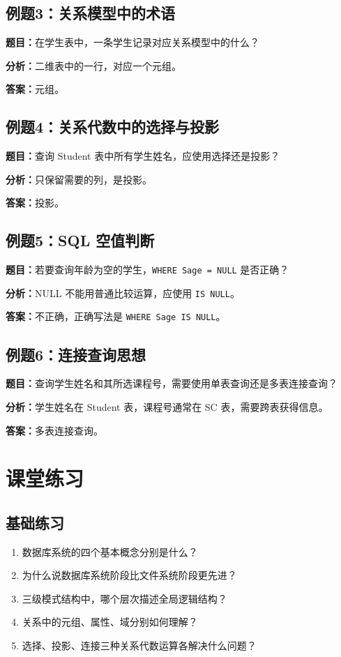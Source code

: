 \documentclass{../../note}
\begin{document}
\subsection{例题3：关系模型中的术语}

\textbf{题目：}在学生表中，一条学生记录对应关系模型中的什么？

\textbf{分析：}二维表中的一行，对应一个元组。

\textbf{答案：}元组。

\subsection{例题4：关系代数中的选择与投影}

\textbf{题目：}查询 Student 表中所有学生姓名，应使用选择还是投影？

\textbf{分析：}只保留需要的列，是投影。

\textbf{答案：}投影。

\subsection{例题5：SQL 空值判断}

\textbf{题目：}若要查询年龄为空的学生，\texttt{WHERE Sage = NULL} 是否正确？

\textbf{分析：}NULL 不能用普通比较运算，应使用 \texttt{IS NULL}。

\textbf{答案：}不正确，正确写法是 \texttt{WHERE Sage IS NULL}。

\subsection{例题6：连接查询思想}

\textbf{题目：}查询学生姓名和其所选课程号，需要使用单表查询还是多表连接查询？

\textbf{分析：}学生姓名在 Student 表，课程号通常在 SC 表，需要跨表获得信息。

\textbf{答案：}多表连接查询。

\section{课堂练习}

\subsection{基础练习}

\begin{enumerate}
  \item 数据库系统的四个基本概念分别是什么？
  \item 为什么说数据库系统阶段比文件系统阶段更先进？
  \item 三级模式结构中，哪个层次描述全局逻辑结构？
  \item 关系中的元组、属性、域分别如何理解？
  \item 选择、投影、连接三种关系代数运算各解决什么问题？
\end{enumerate}
\end{document}
